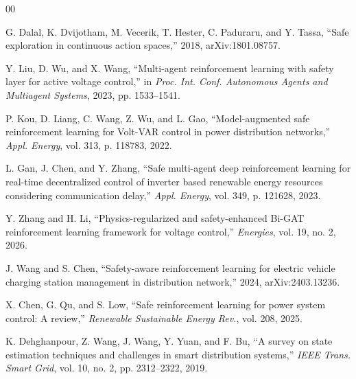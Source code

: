 \documentclass[conference,a4paper]{IEEEtran}
\begin{document}

\begin{thebibliography}{00}
%

 G. Dalal, K. Dvijotham, M. Vecerik, T. Hester, C. Paduraru,
and Y. Tassa, ``Safe exploration in continuous action spaces,'' 2018,
arXiv:1801.08757.

 Y. Liu, D. Wu, and X. Wang, ``Multi-agent reinforcement
learning with safety layer for active voltage control,'' in \emph{Proc. Int.
Conf. Autonomous Agents and Multiagent Systems}, 2023, pp. 1533--1541.

 P. Kou, D. Liang, C. Wang, Z. Wu, and L. Gao,
``Model-augmented safe reinforcement learning for Volt-VAR control in power
distribution networks,'' \emph{Appl. Energy}, vol. 313, p. 118783, 2022.

 L. Gan, J. Chen, and Y. Zhang, ``Safe multi-agent deep
reinforcement learning for real-time decentralized control of inverter based
renewable energy resources considering communication delay,'' \emph{Appl.
Energy}, vol. 349, p. 121628, 2023.

 Y. Zhang and H. Li, ``Physics-regularized and
safety-enhanced Bi-GAT reinforcement learning framework for voltage control,''
\emph{Energies}, vol. 19, no. 2, 2026.

 J. Wang and S. Chen, ``Safety-aware reinforcement learning
for electric vehicle charging station management in distribution network,'' 2024,
arXiv:2403.13236.

 X. Chen, G. Qu, and S. Low, ``Safe reinforcement learning
for power system control: A review,'' \emph{Renewable Sustainable Energy Rev.},
vol. 208, 2025.

 K. Dehghanpour, Z. Wang, J. Wang, Y. Yuan, and F. Bu, ``A
survey on state estimation techniques and challenges in smart distribution
systems,'' \emph{IEEE Trans. Smart Grid}, vol. 10, no. 2, pp. 2312--2322, 2019.


\end{thebibliography}
\end{document}
